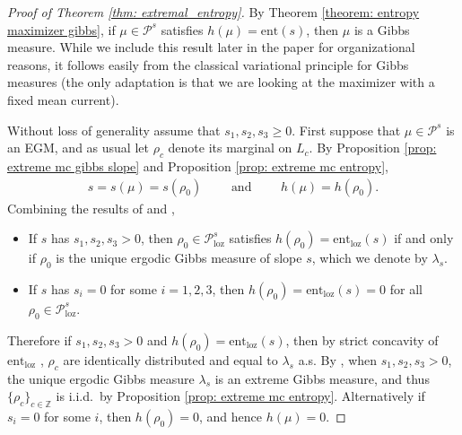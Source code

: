 \documentclass[11pt]{article}
\theoremstyle{remark}
\theoremstyle{definition}
\newcommand{\ent}{\text{ent}}
\newcommand{\mc}[1]{\mathcal{#1}}
\newcommand{\m}[1]{\mathbb{#1}}
\begin{document}
\begin{proof}[Proof of Theorem \ref{thm: extremal_entropy}]

By Theorem \ref{theorem: entropy maximizer gibbs}, if $\mu\in \mc P^s$ satisfies $h(\mu) = \ent(s)$, then $\mu$ is a Gibbs measure. While we include this result later in the paper for organizational reasons, it follows easily from the classical variational principle for Gibbs measures \cite{LanfordRuelle} (the only adaptation is that we are looking at the maximizer with a fixed mean current).

Without loss of generality assume that $s_1,s_2,s_3\geq 0$. First suppose that $\mu\in \mc P^s$ is an EGM, and as usual let $\rho_c$ denote its marginal on $L_c$. By Proposition \ref{prop: extreme mc gibbs slope} and Proposition \ref{prop: extreme mc entropy}, 
\begin{align*}
    s = s(\mu) = s(\rho_0) \qquad \text{ and }\qquad
    h(\mu) = h(\rho_0).
\end{align*}
Combining the results of \cite{cohn2001variational} and \cite{AST_2005__304__R1_0},
\begin{itemize}
    \item If $s$ has $s_1,s_2,s_3>0$, then $\rho_0 \in \mc P_{\text{loz}}^s$ satisfies $h(\rho_0) = \ent_{\text{loz}}(s)$ if and only if $\rho_0$ is the unique ergodic Gibbs measure of slope $s$, which we denote by $\lambda_s$. 
    \item If $s$ has $s_i=0$ for some $i=1,2,3$, then $h(\rho_0) = \ent_{\text{loz}}(s) = 0$ for all $\rho_0\in \mc P_{\text{loz}}^s$. 
\end{itemize}

Therefore if $s_1,s_2,s_3>0$ and $h(\rho_0) = \ent_{\text{loz}}(s)$, then by strict concavity of $\ent_{\text{loz}}$ \cite[Theorem 10.1]{cohn2001variational}, $\rho_c$ are  identically distributed and equal to $\lambda_s$ a.s. By \cite[Theorem 9.1.1]{AST_2005__304__R1_0}, when $s_1,s_2,s_3>0$, the unique ergodic Gibbs measure $\lambda_s$ is an extreme Gibbs measure, and thus $\{\rho_c\}_{c\in \m Z}$ is i.i.d.\ by Proposition \ref{prop: extreme mc entropy}. Alternatively if $s_i=0$ for some $i$, then $h(\rho_0) = 0$, and hence $h(\mu) = 0$. 


\end{proof}
\end{document}
